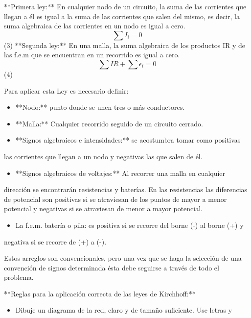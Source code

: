 \documentclass[11pt,a4paper]{article}
\begin{document}
**Primera ley:** En cualquier nodo de un circuito, la suma de las corrientes que llegan a él es igual a la suma de las corrientes que salen del mismo, es decir, la suma algebraica de las corrientes en un nodo es igual a cero. \[ \sum I_i = 0 \] (3) **Segunda ley:** En una malla, la suma algebraica de los productos IR y de las f.e.m que se encuentran en un recorrido es igual a cero. \[ \sum IR + \sum \epsilon_i = 0 \] (4)

Para aplicar esta Ley es necesario definir:

\begin{itemize}[leftmargin=1.4em,itemsep=2pt,topsep=3pt]
  \item **Nodo:** punto donde se unen tres o más conductores.
  \item **Malla:** Cualquier recorrido seguido de un circuito cerrado.
  \item **Signos algebraicos e intensidades:** se acostumbra tomar como positivas
\end{itemize}

las corrientes que llegan a un nodo y negativas las que salen de él.

\begin{itemize}[leftmargin=1.4em,itemsep=2pt,topsep=3pt]
  \item **Signos algebraicos de voltajes:** Al recorrer una malla en cualquier
\end{itemize}

dirección se encontrarán resistencias y baterías. En las resistencias las diferencias de potencial son positivas si se atraviesan de los puntos de mayor a menor potencial y negativas si se atraviesan de menor a mayor potencial.

\begin{itemize}[leftmargin=1.4em,itemsep=2pt,topsep=3pt]
  \item La f.e.m. batería o pila: es positiva si se recorre del borne (-) al borne (+) y
\end{itemize}

negativa si se recorre de (+) a (-).

Estos arreglos son convencionales, pero una vez que se haga la selección de una convención de signos determinada ésta debe seguirse a través de todo el problema.

**Reglas para la aplicación correcta de las leyes de Kirchhoff:**

\begin{itemize}[leftmargin=1.4em,itemsep=2pt,topsep=3pt]
  \item Dibuje un diagrama de la red, claro y de tamaño suficiente. Use letras y
\end{itemize}
\end{document}
